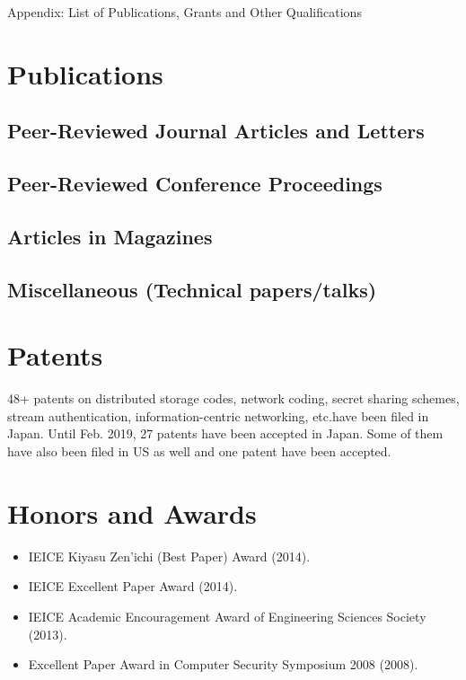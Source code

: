 \newpage
\begin{center}
\Large
Appendix: List of Publications, Grants and Other Qualifications
\end{center}

\section*{Publications}

\subsection*{Peer-Reviewed Journal Articles and Letters}



\subsection*{Peer-Reviewed Conference Proceedings}


\subsection*{Articles in Magazines}


\subsection*{Miscellaneous (Technical papers/talks)}



\section*{Patents}
48+ patents on distributed storage codes, network coding, secret sharing schemes, stream authentication, information-centric networking, etc.\@ have been filed in Japan. Until Feb. 2019, 27 patents have been accepted in Japan. Some of them have also been filed in US as well and one patent have been accepted.



\section*{Honors and Awards}
\begin{itemize}
\item IEICE Kiyasu Zen'ichi (Best Paper) Award (2014).
\item IEICE Excellent Paper Award (2014).
\item IEICE Academic Encouragement Award of Engineering Sciences Society (2013).
\item Excellent Paper Award in Computer Security Symposium 2008 (2008).
\end{itemize}

